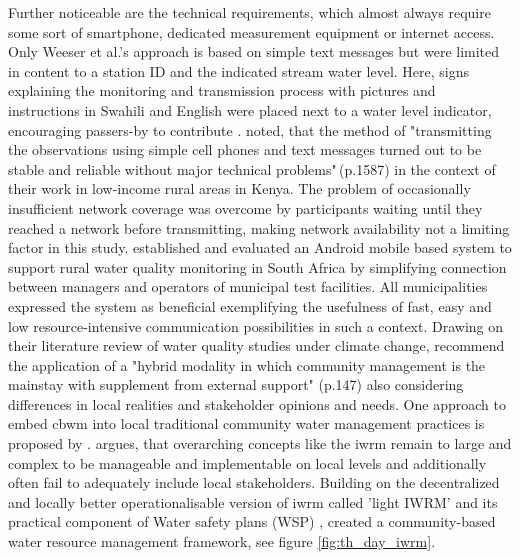 Further noticeable are the technical requirements, which almost always require some sort of smartphone, dedicated measurement equipment or internet access. Only Weeser et al.'s \citeyear{weeserCitizenSciencePioneers2018a} approach is based on simple text messages but were limited in content to a station ID and the indicated stream water level. Here, signs explaining the monitoring and transmission process with pictures and instructions in Swahili and English were placed next to a water level indicator, encouraging passers-by to contribute \autocite{weeserCitizenSciencePioneers2018a}. \Textcite{weeserCitizenSciencePioneers2018a} noted, that the method of "transmitting the observations using simple cell phones and text messages turned out to be stable and reliable without major technical problems"\,(p.1587) in the context of their work in low-income rural areas in Kenya. The problem of occasionally insufficient network coverage was overcome by participants waiting until they reached a network before transmitting, making network availability not a limiting factor in this study. \autocite{wilson-jonesUsingMobilePhones2012} established and evaluated an Android mobile based system to support rural water quality monitoring in South Africa by simplifying connection between managers and operators of municipal test facilities. All municipalities expressed the system as beneficial exemplifying the usefulness of fast, easy and low resource-intensive communication possibilities in such a context.\newline
Drawing on their literature review of water quality studies under climate change, \textcite{huangManagementDrinkingWater2020} recommend the application of a "hybrid modality in which community management is the mainstay with supplement from external support" (p.147) also considering differences in local realities and stakeholder opinions and needs. One approach to embed \acrshort{cbwm} into local traditional community water management practices is proposed by \autocite{dayCommunitybasedWaterResources2009}. \Textcite{dayCommunitybasedWaterResources2009} argues, that overarching concepts like the \acrfull{iwrm} remain to large and complex to be manageable and implementable on local levels and additionally often fail to adequately include local stakeholders. Building on the decentralized and locally better operationalisable version of \acrshort{iwrm} called 'light IWRM' \autocite{butterworthFindingPracticalApproaches2010,moriartyIntegratedWaterResources2004} and its practical component of Water safety plans (WSP) \autocite{bartramWaterSafetyPlan2009}, \textcite{dayCommunitybasedWaterResources2009} created a community-based water resource management framework, see figure \ref{fig:th_day_iwrm}. 


